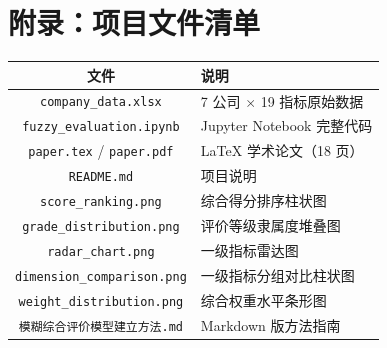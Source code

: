 \documentclass[a4paper,11pt]{ctexart}
\begin{document}
\section*{附录：项目文件清单}

\begin{table}[H]
\centering
\begin{tabular}{cl}
\toprule
\textbf{文件} & \textbf{说明} \\
\midrule
\texttt{company\_data.xlsx} & 7 公司 $\times$ 19 指标原始数据 \\
\texttt{fuzzy\_evaluation.ipynb} & Jupyter Notebook 完整代码 \\
\texttt{paper.tex} / \texttt{paper.pdf} & LaTeX 学术论文（18 页） \\
\texttt{README.md} & 项目说明 \\
\texttt{score\_ranking.png} & 综合得分排序柱状图 \\
\texttt{grade\_distribution.png} & 评价等级隶属度堆叠图 \\
\texttt{radar\_chart.png} & 一级指标雷达图 \\
\texttt{dimension\_comparison.png} & 一级指标分组对比柱状图 \\
\texttt{weight\_distribution.png} & 综合权重水平条形图 \\
\texttt{\mbox{模糊综合评价模型建立方法.md}} & Markdown 版方法指南 \\
\bottomrule
\end{tabular}
\end{table}
\end{document}
